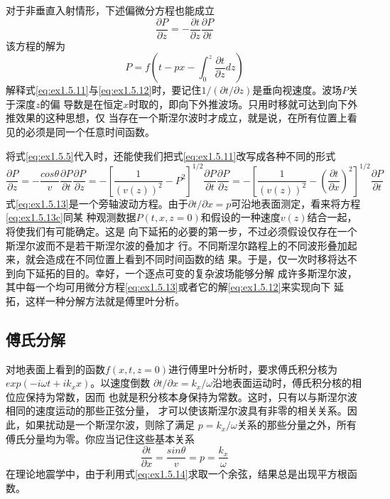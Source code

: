 对于非垂直入射情形，下述偏微分方程也能成立
\begin{equation}
\frac{\partial P}{\partial z}=-\frac{\partial t}{\partial z}\frac{\partial P}{\partial t}
\label{eq:ex1.5.11}
\end{equation}
该方程的解为
\begin{equation}
P=f(t-px-\int_0^z\frac{\partial t}{\partial z}dz) 
\label{eq:ex1.5.12}
\end{equation}
解释式\ref{eq:ex1.5.11}与\ref{eq:ex1.5.12}时，要记住$1/(\partial t/\partial z)$是垂向视速度。波场$P$关于深度$z$的偏
导数是在恒定$x$时取的，即向下外推波场。只用时移就可达到向下外推效果的这种思想，仅
当存在一个斯涅尔波时才成立，就是说，在所有位置上看见的必须是同一个任意时间函数。

将式\ref{eq:ex1.5.5}代入时，还能使我们把式\ref{eq:ex1.5.11}改写成各种不同的形式
\begin{subequations}\label{eq:ex1.5.13}
\begin{equation}
\frac{\partial P}{\partial z}=-\frac{cos\theta}{v}\frac{\partial P}{\partial t}
\label{eq:ex1.5.13a}
\end{equation}
\begin{equation}
\frac{\partial P}{\partial z}=-[\frac{1}{(v(z))^2}-P^2]^{1/2}\frac{\partial P}{\partial t}
\label{eq:ex1.5.13b}
\end{equation}
\begin{equation}
\frac{\partial P}{\partial z}=-[\frac{1}{(v(z))^2}-(\frac{\partial t}{\partial x})^2]^{1/2}\frac{\partial P}{\partial t}
\label{eq:ex1.5.13c}
\end{equation}
\end{subequations}
式\ref{eq:ex1.5.13}是一个旁轴波动方程。由于$\partial t/\partial x=p$可沿地表面测定，看来将方程\ref{eq:ex1.5.13c}同某 种观测数据$P(t,x,z=0)$和假设的一种速度$v(z)$结合一起，将使我们有可能确定。这是
向下延拓的必要的第一步，不过必须假设仅存在一个斯涅尔波而不是若干斯涅尔波的叠加才
行。不同斯涅尔路程上的不同波形叠加起来，就会造成在不同位置上看到不同时间函数的结
果。于是，仅一次时移将达不到向下延拓的目的。幸好，一个逐点可变的复杂波场能够分解
成许多斯涅尔波，其中每一个均可用微分方程\ref{eq:ex1.5.13}或者它的解\ref{eq:ex1.5.12}来实现向下
延拓，这样一种分解方法就是傅里叶分析。 

\subsection{傅氏分解}
对地表面上看到的函数$f(x,t,z = 0)$进行傅里叶分析时，要求傅氏积分核为$exp(-i\omega t+ik_xx)$。以速度倒数
$\partial t/\partial x=k_x/\omega$沿地表面运动时，傅氏积分核的相位应保持为常数，因而
也就是积分核本身保持为常数。这时，只有以与斯涅尔波相同的速度运动的那些正弦分量，
才可以使该斯涅尔波具有非零的相关关系。因此，如果扰动是一个斯涅尔波，则除了满足
$p=k_x/\omega$关系的那些分量之外，所有傅氏分量均为零。你应当记住这些基本关系
\begin{equation}
\frac{\partial t}{\partial x}=\frac{sin\theta}{v}=p=\frac{k_x}{\omega}
\label{eq:ex1.5.14}
\end{equation}
在理论地震学中，由于利用式\ref{eq:ex1.5.14}求取一个余弦，结果总是出现平方根函数。


